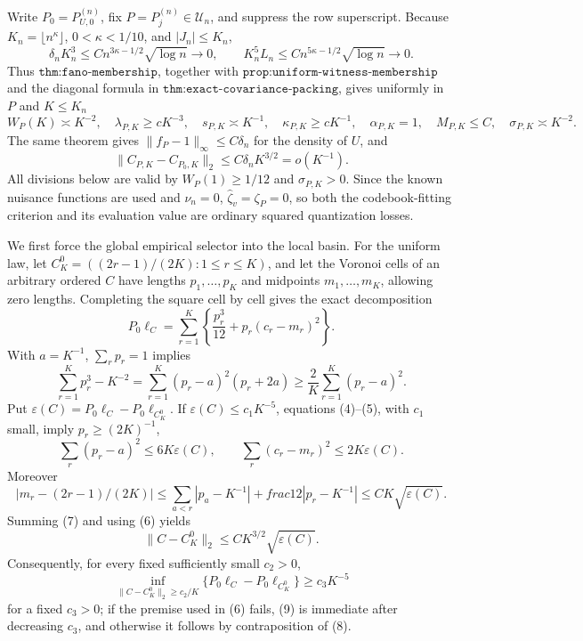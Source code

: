 Write \(P_0=P_{U,0}^{(n)}\), fix \(P=P_j^{(n)}\in\mathcal U_n\), and suppress the row superscript.  Because \(K_n=\lfloor n^\kappa\rfloor\), \(0<\kappa<1/10\), and \(|J_n|\leq K_n\),
\[
 \delta_nK_n^3\leq Cn^{3\kappa-1/2}\sqrt{\log n}\longrightarrow0,
 \qquad
 K_n^5L_n\leq Cn^{5\kappa-1/2}\sqrt{\log n}\longrightarrow0.                 \tag{1}
\]
Thus \(\texttt{thm:fano-membership}\), together with \(\texttt{prop:uniform-witness-membership}\) and the diagonal formula in \(\texttt{thm:exact-covariance-packing}\), gives uniformly in \(P\) and \(K\leq K_n\)
\[
 W_P(K)\asymp K^{-2},\quad \lambda_{P,K}\geq cK^{-3},\quad
 s_{P,K}\asymp K^{-1},\quad \kappa_{P,K}\geq cK^{-1},\quad
 \alpha_{P,K}=1,\quad M_{P,K}\leq C,\quad \sigma_{P,K}\asymp K^{-2}.          \tag{2}
\]
The same theorem gives \(\|f_P-1\|_\infty\leq C\delta_n\) for the density of \(U\), and
\[
 \|C_{P,K}-C_{P_0,K}\|_2\leq C\delta_nK^{3/2}=o(K^{-1}).                       \tag{3}
\]
All divisions below are valid by \(W_P(1)\geq1/12\) and \(\sigma_{P,K}>0\).  Since the known nuisance functions are used and \(\nu_n=0\), \(\widehat\zeta_v=\zeta_P=0\), so both the codebook-fitting criterion and its evaluation value are ordinary squared quantization losses.

We first force the global empirical selector into the local basin.  For the uniform law, let \(C^0_K=((2r-1)/(2K):1\leq r\leq K)\), and let the Voronoi cells of an arbitrary ordered \(C\) have lengths \(p_1,\ldots,p_K\) and midpoints \(m_1,\ldots,m_K\), allowing zero lengths.  Completing the square cell by cell gives the exact decomposition
\[
 P_0\ell_C=\sum_{r=1}^K\left\{\frac{p_r^3}{12}+p_r(c_r-m_r)^2\right\}.          \tag{4}
\]
With \(a=K^{-1}\), \(\sum_rp_r=1\) implies
\[
 \sum_{r=1}^Kp_r^3-K^{-2}
 =\sum_{r=1}^K(p_r-a)^2(p_r+2a)
 \geq\frac2K\sum_{r=1}^K(p_r-a)^2.                                           \tag{5}
\]
Put \(\varepsilon(C)=P_0\ell_C-P_0\ell_{C_K^0}\).  If \(\varepsilon(C)\leq c_1K^{-5}\), equations (4)--(5), with \(c_1\) small, imply \(p_r\geq(2K)^{-1}\),
\[
 \sum_r(p_r-a)^2\leq6K\varepsilon(C),
 \qquad
 \sum_r(c_r-m_r)^2\leq2K\varepsilon(C).                                      \tag{6}
\]
Moreover
\[
 |m_r-(2r-1)/(2K)|
 \leq\sum_{a<r}|p_a-K^{-1}|+  frac12|p_r-K^{-1}|
 \leq C K\sqrt{\varepsilon(C)}.                                                \tag{7}
\]
Summing (7) and using (6) yields
\[
 \|C-C_K^0\|_2\leq CK^{3/2}\sqrt{\varepsilon(C)}.                             \tag{8}
\]
Consequently, for every fixed sufficiently small \(c_2>0\),
\[
 \inf_{\|C-C_K^0\|_2\geq c_2/K}\{P_0\ell_C-P_0\ell_{C_K^0}\}\geq c_3K^{-5} \tag{9}
\]
for a fixed \(c_3>0\); if the premise used in (6) fails, (9) is immediate after decreasing \(c_3\), and otherwise it follows by contraposition of (8).

